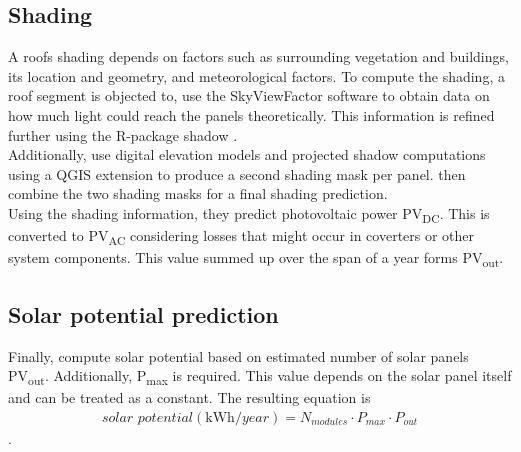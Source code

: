 \documentclass{article} %
\begin{document}
\subsection*{Shading}
A roofs shading depends on factors such as surrounding vegetation and buildings, its location and geometry, and meteorological factors. To compute the shading, a roof segment is objected to, \citet{de2021predicting} use the SkyViewFactor software \cite{zakvsek2011sky} to obtain data on how much light could reach the panels theoretically. This information is refined further using the R-package shadow \cite{dorman2019shadow}.\\
Additionally, \citet{de2021predicting} use digital elevation models and projected shadow computations using a QGIS extension \cite{qgis,qgisshadows} to produce a second shading mask per panel. \citet{de2021predicting} then combine the two shading masks for a final shading prediction.\\
Using the shading information, they predict photovoltaic power \si{PV_{\si{DC}}}. This is converted to \si{PV_{\si{AC}}} considering losses that might occur in coverters or other system components. This value summed up over the span of a year forms \si{PV_{out}}.



\subsection*{Solar potential prediction}
Finally, \citet{de2021predicting} compute solar potential based on estimated number of solar panels \si{PV_{out}}. Additionally, \si{P_{max}} is required. This value 	depends on the solar panel itself and can be treated as a constant. The resulting equation is
\begin{align*}
	\textit{solar potential} (\si{\kilo\watt \hour \per year}) = N_{\textit{modules}} \cdot \si{P_{max}} \cdot \si{P_{out}}
\end{align*}.
\end{document}
